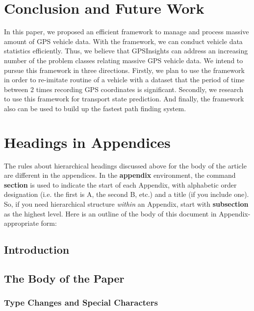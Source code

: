 \documentclass{acm_proc_article-sp}
\begin{document}
	\section{Conclusion and Future Work}
	In this paper, we proposed an efficient framework to manage and process massive amount of GPS vehicle data. With the framework, we can conduct vehicle data statistics efficiently. Thus, we believe that GPSInsights can address an increasing number of the problem classes relating massive GPS vehicle data. We intend to pursue this framework in three directions. Firstly, we plan to use the framework in order to re-imitate routine of a vehicle with a dataset that the period of time between 2 times recording GPS coordinates is significant. Secondly, we research to use this framework for transport state prediction. And finally, the framework also can be used to build up the fastest path finding system.
			

%

%
%
\appendix
\section{Headings in Appendices}
The rules about hierarchical headings discussed above for
the body of the article are different in the appendices.
In the \textbf{appendix} environment, the command
\textbf{section} is used to
indicate the start of each Appendix, with alphabetic order
designation (i.e. the first is A, the second B, etc.) and
a title (if you include one).  So, if you need
hierarchical structure
\textit{within} an Appendix, start with \textbf{subsection} as the
highest level. Here is an outline of the body of this
document in Appendix-appropriate form:
\subsection{Introduction}
\subsection{The Body of the Paper}
\subsubsection{Type Changes and  Special Characters}
\end{document}
